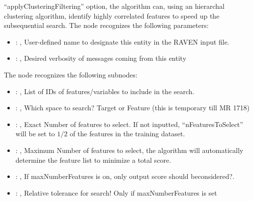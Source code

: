 \begin{itemize}
\begin{itemize}
          ``applyClusteringFiltering'' option, the algorithm can, using an hierarchal clustering
          algorithm,         identify highly correlated features to speed up the subsequential
          search.
          The  node recognizes the following parameters:
            \begin{itemize}
              \item {}: , 
                User-defined name to designate this entity in the RAVEN input file.
              \item {}: , 
                Desired verbosity of messages coming from this entity
          \end{itemize}

          The  node recognizes the following subnodes:
          \begin{itemize}
            \item {}: , 
              List of IDs of features/variables to include in the search.

            \item {}: , 
              Which space to search? Target or Feature (this is temporary till MR 1718)

            \item {}: , 
              Exact Number of features to select. If not inputted, ``nFeaturesToSelect'' will be set
              to $1/2$ of the features in the training dataset.

            \item {}: , 
              Maximum Number of features to select, the algorithm will automatically determine the
              feature list to minimize a total score.

            \item {}: , 
              If maxNumberFeatures is on, only output score should beconsidered?.

            \item {}: , 
              Relative tolerance for search! Only if maxNumberFeatures is set


\end{itemize}
\end{itemize}
\end{itemize}
